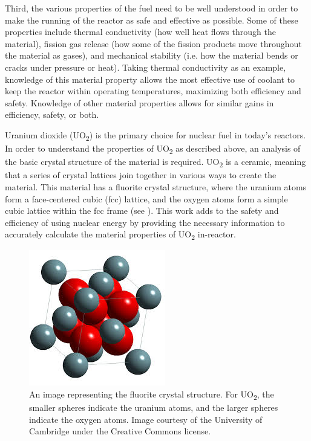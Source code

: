 \documentclass[12pt]{report}
\begin{document}
Third, the various properties of the fuel need to be well understood in order to make the running of the reactor as safe and effective as possible.  Some of these properties include thermal conductivity (how well heat flows through the material), fission gas release (how some of the fission products move throughout the material as gases), and mechanical stability (i.e. how the material bends or cracks under pressure or heat).  Taking thermal conductivity as an example, knowledge of this material property allows the most effective use of coolant to keep the reactor within operating temperatures, maximizing both efficiency and safety.  Knowledge of other material properties allows for similar gains in efficiency, safety, or both.

Uranium dioxide (UO\textsubscript{2}) is the primary choice for nuclear fuel in today's reactors.\cite{uraniumInfo}  In order to understand the properties of UO\textsubscript{2} as described above, an analysis of the basic crystal structure of the material is required.  UO\textsubscript{2} is a ceramic, meaning that a series of crystal lattices join together in various ways to create the material.  This material has a fluorite crystal structure, where the uranium atoms form a face-centered cubic (fcc) lattice, and the oxygen atoms form a simple cubic lattice within the fcc frame (see ).  This work adds to the safety and efficiency of using nuclear energy by providing the necessary information to accurately calculate the material properties of UO\textsubscript{2} in-reactor.

\begin{figure}[ht!]
\centering
\includegraphics[scale=1.0]{Images/UO2}
\caption{\label{fig:uo2Lattice}An image representing the fluorite crystal structure.  For UO\textsubscript{2}, the smaller spheres indicate the uranium atoms, and the larger spheres indicate the oxygen atoms.  Image courtesy of the University of Cambridge under the Creative Commons license.}
\end{figure}
\end{document}

